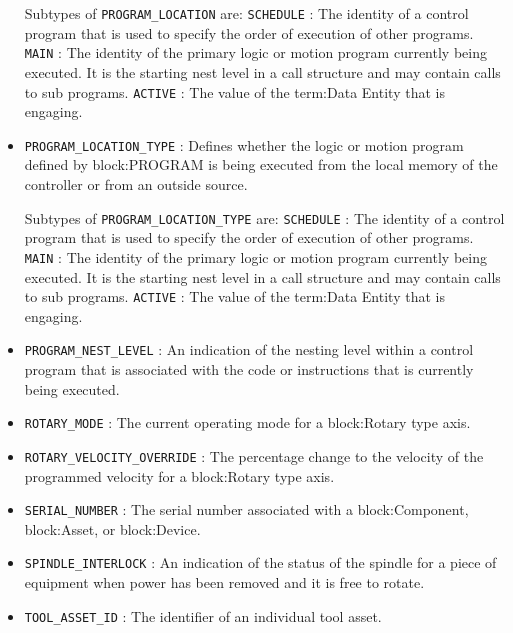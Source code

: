 \begin{itemize}
Subtypes of \texttt{PROGRAM_LOCATION} are: 
\newline\tab \texttt{SCHEDULE} : The identity of a control program that is used to specify the order of execution of other programs. 
\newline\tab \texttt{MAIN} : The identity of the primary logic or motion program currently being executed. It is the starting nest level in a call structure and may contain calls to sub programs. 
\newline\tab \texttt{ACTIVE} : The value of the {term:Data Entity} that is engaging. 
\item \texttt{PROGRAM_LOCATION_TYPE} : Defines whether the logic or motion program defined by {block:PROGRAM} is being executed from the local memory of the controller or from an outside source. 

Subtypes of \texttt{PROGRAM_LOCATION_TYPE} are: 
\newline\tab \texttt{SCHEDULE} : The identity of a control program that is used to specify the order of execution of other programs. 
\newline\tab \texttt{MAIN} : The identity of the primary logic or motion program currently being executed. It is the starting nest level in a call structure and may contain calls to sub programs. 
\newline\tab \texttt{ACTIVE} : The value of the {term:Data Entity} that is engaging. 
\item \texttt{PROGRAM_NEST_LEVEL} : An indication of the nesting level within a control program that is associated with the code or instructions that is currently being executed. 

\item \texttt{ROTARY_MODE} : The current operating mode for a {block:Rotary} type axis. 

\item \texttt{ROTARY_VELOCITY_OVERRIDE} : The percentage change to the velocity of the programmed velocity for a {block:Rotary} type axis. 

\item \texttt{SERIAL_NUMBER} : The serial number associated with a {block:Component}, {block:Asset}, or {block:Device}. 

\item \texttt{SPINDLE_INTERLOCK} : An indication of the status of the spindle for a piece of equipment when power has been removed and it is free to rotate. 

\item \texttt{TOOL_ASSET_ID} : The identifier of an individual tool asset. 


\end{itemize}

